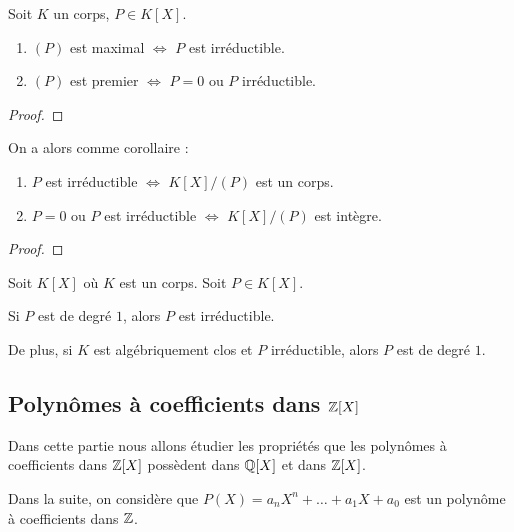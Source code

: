 \begin{proposition}
	Soit $K$ un corps, $P \in K[X]$.
	\begin{enumerate}
		\item $(P)$ est maximal $\Leftrightarrow$ $P$ est irréductible.
		\item $(P)$ est premier $\Leftrightarrow$ $P = 0$ ou $P$
			irréductible.
	\end{enumerate}
\end{proposition}

\ifdefined\outputproof
\begin{proof}

\end{proof}
\fi

On a alors comme corollaire :

\begin{corollary}
	\begin{enumerate}
		\item $P$ est irréductible $\Leftrightarrow$ $K[X]/(P)$ est un corps.
		\item $P = 0$ ou $P$ est irréductible $\Leftrightarrow$ $K[X]/(P)$ est
			intègre.
	\end{enumerate}
\end{corollary}

\ifdefined\outputproof
\begin{proof}

\end{proof}
\fi

\begin{proposition}
	Soit $K[X]$ où $K$ est un corps. Soit $P \in K[X]$.

	Si $P$ est de degré $1$, alors $P$ est irréductible.

	De plus, si $K$ est algébriquement clos et $P$ irréductible, alors $P$ est
	de degré $1$.
\end{proposition}

\subsection{Polynômes à coefficients dans $\mathbb{Z}[X]$}

Dans cette partie nous allons étudier les propriétés que les polynômes à
coefficients dans $\mathbb{Z}[X]$ possèdent dans $\mathbb{Q}[X]$ et dans
$\mathbb{Z}[X]$.


Dans la suite, on considère que $P(X) = a_{n}X^{n} + \ldots + a_{1}X + a_{0}$
est un polynôme à coefficients dans $\mathbb{Z}$.

